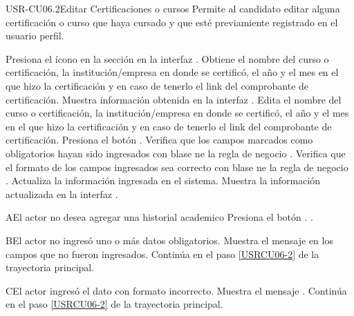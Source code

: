 \begin{UseCase}[]{USR-CU06.2}{Editar Certificaciones o cursos}{
	Permite al candidato editar alguna certificación o curso  que haya cursado y que esté previamiente registrado en el usuario perfil.
}
\end{UseCase}

\begin{UCtrayectoria}
	\UCpaso [\UCactor] Presiona el ícono \IUEditar{} en la sección en la interfaz .
	\UCpaso Obtiene  el nombre del curso o certificación, la institución/empresa en donde se certificó, el año y el mes en el que hizo la certificación y en caso de tenerlo el link del comprobante de certificación.
	\UCpaso Muestra información obtenida en la interfaz .
	\UCpaso [\UCsist] \label{USRCU06-2} Edita  el nombre del curso o certificación, la institución/empresa en donde se certificó, el año y el mes en el que hizo la certificación y en caso de tenerlo el link del comprobante de certificación.
	\UCpaso [\UCsist] Presiona el botón .
	\UCpaso Verifica que los campos marcados como obligatorios hayan sido ingresados con blase ne la regla de negocio .
	\UCpaso Verifica que el formato de los campos ingresados sea correcto con blase ne la regla de negocio .
	\UCpaso Actualiza la información ingresada en el sistema.
	\UCpaso Muestra la información actualizada en la interfaz . 
\end{UCtrayectoria}

\begin{UCtrayectoriaA}{A}{El actor no desea agregar una historial academico}
	\UCpaso [\UCsist] Presiona el botón .
	.
\end{UCtrayectoriaA} 

\begin{UCtrayectoriaA}{B}{El actor no ingresó uno o más datos obligatorios.}
	\UCpaso [\UCsist] Muestra el mensaje  en los campos que no fueron ingresados.
	\UCpaso [\UCsist] Continúa en el paso \ref{USRCU06-2} de la trayectoria principal.
\end{UCtrayectoriaA} 

\begin{UCtrayectoriaA}{C}{El actor ingresó el dato con formato incorrecto.}
	\UCpaso [\UCsist] Muestra el mensaje .
	\UCpaso [\UCsist] Continúa en el paso \ref{USRCU06-2} de la trayectoria principal.
\end{UCtrayectoriaA}



